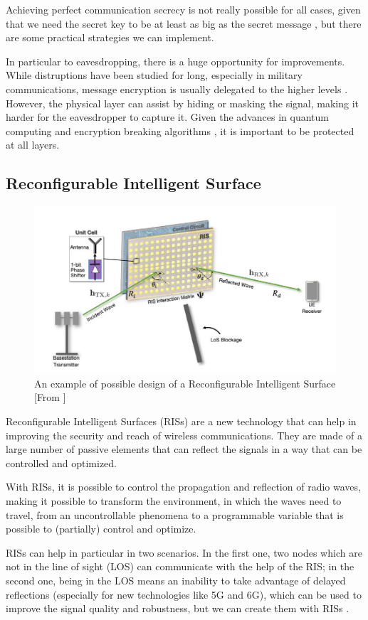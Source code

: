 
Achieving perfect communication secrecy is not really possible for all cases, given that we need the secret key to be at least as big as the secret message \cite{6769090}, but there are some practical strategies we can implement.

In particular to eavesdropping, there is a huge opportunity for improvements. While distruptions have been studied for long, especially in military communications, message encryption is usually delegated to the higher levels \cite{6739367}. However, the physical layer can assist by hiding or masking the signal, making it harder for the eavesdropper to capture it. Given the advances in quantum computing and encryption breaking algorithms \cite{365700}, it is important to be protected at all layers.

\subsection{Reconfigurable Intelligent Surface}

\begin{figure}[H]
  \centering
  \includegraphics[width=0.5\linewidth]{imgs/RIS model.png}
  \caption{An example of possible design of a Reconfigurable Intelligent Surface [From \cite{9732917}]}
\end{figure}

Reconfigurable Intelligent Surfaces (RISs) are a new technology that can help in improving the security and reach of wireless communications. They are made of a large number of passive elements that can reflect the signals in a way that can be controlled and optimized.

With RISs, it is possible to control the propagation and reflection of radio waves, making it possible to transform the environment, in which the waves need to travel, from an uncontrollable phenomena to a programmable variable that is possible to (partially) control and optimize.

RISs can help in particular in two scenarios. In the first one, two nodes which are not in the line of sight (LOS) can communicate with the help of the RIS; in the second one, being in the LOS means an inability to take advantage of delayed reflections (especially for new technologies like 5G and 6G), which can be used to improve the signal quality and robustness, but we can create them with RISs \cite{9086766}.

